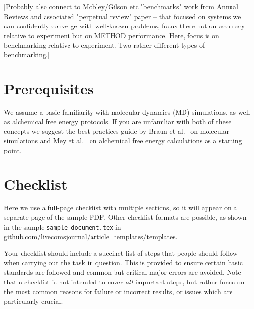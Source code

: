 \documentclass[9pt,bestpractices]{livecoms}
\begin{document}
[Probably also connect to Mobley/Gilson etc "benchmarks" work from Annual Reviews and associated "perpetual review" paper -- that focused on systems we can confidently converge with well-known problems; focus there not on accuracy relative to experiment but on METHOD performance. Here, focus is on benchmarking relative to experiment. Two rather different types of benchmarking.]

\section{Prerequisites}
We assume a basic familiarity with molecular dynamics (MD) simulations, as well as alchemical free energy protocols. If you are unfamiliar with both of these concepts we suggest the best practices guide by Braun et al.~\cite{braun2019best} on molecular simulations and Mey et al.~\cite{mey2020best} on alchemical free energy calculations as a starting point. 

\section{Checklist}
Here we use a full-page checklist with multiple sections, so it will appear on a separate page of the sample PDF.
Other checklist formats are possible, as shown in the sample \texttt{sample-document.tex} in \url{github.com/livecomsjournal/article_templates/templates}.

Your checklist should include a succinct list of steps that people should follow when carrying out the task in question.
This is provided to ensure certain basic standards are followed and common but critical major errors are avoided.
Note that a checklist is not intended to cover \emph{all} important steps, but rather focus on the most common reasons for failure or incorrect results, or issues which are particularly crucial.


\end{document}
